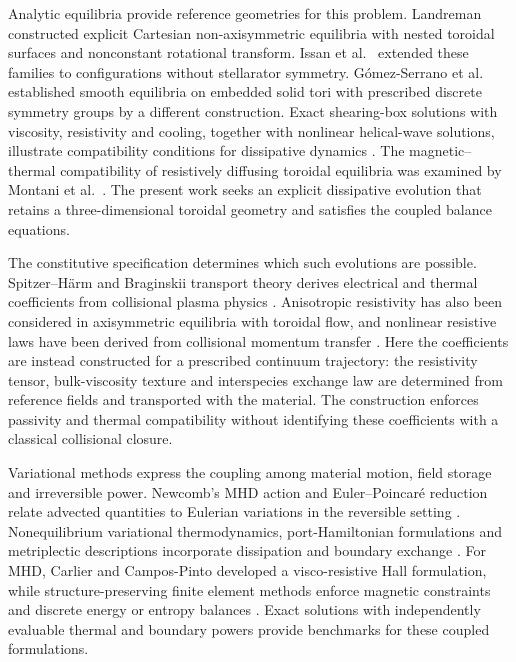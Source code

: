 \documentclass[11pt,a4paper]{article}
\theoremstyle{remark}\newtheorem{remark}{Remark}
\numberwithin{equation}{section}
\begin{document}
Analytic equilibria provide reference geometries for this problem. Landreman \citep{Landreman} constructed explicit Cartesian non-axisymmetric equilibria with nested toroidal surfaces and nonconstant rotational transform. Issan et al.\ \citep{Issan} extended these families to configurations without stellarator symmetry. G\'omez-Serrano et al.\ \citep{Gomez2026} established smooth equilibria on embedded solid tori with prescribed discrete symmetry groups by a different construction. Exact shearing-box solutions with viscosity, resistivity and cooling, together with nonlinear helical-wave solutions, illustrate compatibility conditions for dissipative dynamics \citep{Lesaffre2007,Zhu2014}. The magnetic--thermal compatibility of resistively diffusing toroidal equilibria was examined by Montani et al.\ \citep{Montani}. The present work seeks an explicit dissipative evolution that retains a three-dimensional toroidal geometry and satisfies the coupled balance equations.

The constitutive specification determines which such evolutions are possible. Spitzer--H\"arm and Braginskii transport theory derives electrical and thermal coefficients from collisional plasma physics \citep{Spitzer,Braginskii1965}. Anisotropic resistivity has also been considered in axisymmetric equilibria with toroidal flow, and nonlinear resistive laws have been derived from collisional momentum transfer \citep{Poulipoulis,Lingam}. Here the coefficients are instead constructed for a prescribed continuum trajectory: the resistivity tensor, bulk-viscosity texture and interspecies exchange law are determined from reference fields and transported with the material. The construction enforces passivity and thermal compatibility without identifying these coefficients with a classical collisional closure.

Variational methods express the coupling among material motion, field storage and irreversible power. Newcomb's MHD action and Euler--Poincar\'e reduction relate advected quantities to Eulerian variations in the reversible setting \citep{Newcomb1962,Holm1998}. Nonequilibrium variational thermodynamics, port-Hamiltonian formulations and metriplectic descriptions incorporate dissipation and boundary exchange \citep{GayBalmaz2017a,GayBalmaz2017b,PortHamiltonian,Materassi2012,Coquinot2020}. For MHD, Carlier and Campos-Pinto \citep{Carlier} developed a visco-resistive Hall formulation, while structure-preserving finite element methods enforce magnetic constraints and discrete energy or entropy balances \citep{Gawlik2021,Gawlik2025}. Exact solutions with independently evaluable thermal and boundary powers provide benchmarks for these coupled formulations.
\end{document}
